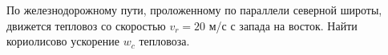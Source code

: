 По железнодорожному пути, проложенному по параллели северной широты,
движется тепловоз со скоростью $v_r=20$ м/с с запада на восток. Найти
кориолисово ускорение $w_c$ тепловоза.
